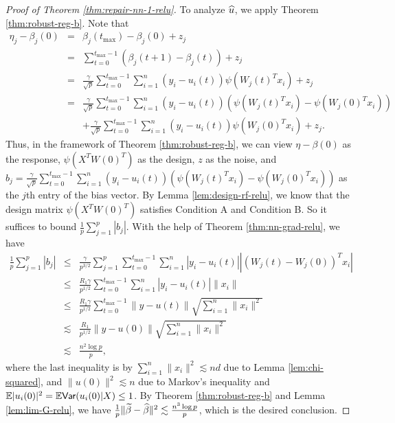 \begin{proof}[Proof of Theorem \ref{thm:repair-nn-1-relu}]
To analyze $\widehat{u}$, we apply Theorem \ref{thm:robust-reg-b}. Note that
\begin{eqnarray*}
\eta_j - \beta_j(0) &=& \beta_j(t_{\max}) - \beta_j(0) +z_j \\
&=& \sum_{t=0}^{t_{\max}-1}\left(\beta_j(t+1)-\beta_j(t)\right) + z_j \\
&=& \frac{\gamma}{\sqrt{p}}\sum_{t=0}^{t_{\max}-1}\sum_{i=1}^n(y_i-u_i(t))\psi(W_j(t)^Tx_i) + z_j \\
&=& \frac{\gamma}{\sqrt{p}}\sum_{t=0}^{t_{\max}-1}\sum_{i=1}^n(y_i-u_i(t))(\psi(W_j(t)^Tx_i)-\psi(W_j(0)^Tx_i)) \\
&& + \frac{\gamma}{\sqrt{p}}\sum_{t=0}^{t_{\max}-1}\sum_{i=1}^n(y_i-u_i(t))\psi(W_j(0)^Tx_i) + z_j.
\end{eqnarray*}
Thus, in the framework of Theorem \ref{thm:robust-reg-b}, we can view $\eta-\beta(0)$ as the response, $\psi(X^TW(0)^T)$ as the design, $z$ as the noise, and $b_j=\frac{\gamma}{\sqrt{p}}\sum_{t=0}^{t_{\max}-1}\sum_{i=1}^n(y_i-u_i(t))(\psi(W_j(t)^Tx_i)-\psi(W_j(0)^Tx_i))$ as the $j$th entry of the bias vector. By Lemma \ref{lem:design-rf-relu}, we know that the design matrix $\psi(X^TW(0)^T)$ satisfies Condition A and Condition B. So it suffices to bound $\frac{1}{p}\sum_{j=1}^p|b_j|$. With the help of Theorem \ref{thm:nn-grad-relu}, we have
\begin{eqnarray*}
\frac{1}{p}\sum_{j=1}^p|b_j| &\leq& \frac{\gamma}{p^{3/2}}\sum_{j=1}^p\sum_{t=0}^{t_{\max}-1}\sum_{i=1}^n|y_i-u_i(t)||(W_j(t)-W_j(0))^Tx_i| \\
&\leq& \frac{R_1\gamma}{p^{1/2}}\sum_{t=0}^{t_{\max}-1}\sum_{i=1}^n|y_i-u_i(t)|\|x_i\| \\
&\leq& \frac{R_1\gamma}{p^{1/2}}\sum_{t=0}^{t_{\max}-1}\|y-u(t)\|\sqrt{\sum_{i=1}^n\|x_i\|^2} \\
&\lesssim& \frac{R_1}{p^{1/2}}\|y-u(0)\|\sqrt{\sum_{i=1}^n\|x_i\|^2} \\
&\lesssim& \frac{n^2\log p}{p},
\end{eqnarray*}
where the last inequality is by $\sum_{i=1}^n\|x_i\|^2\lesssim nd$ due to Lemma \ref{lem:chi-squared}, and $\|u(0)\|^2\lesssim n$ due to Markov's inequality and $\mathbb{E}|u_i(0)|^2 = \mathbb{E}\textsf{Var}(u_i(0)|X) \leq 1$. By Theorem \ref{thm:robust-reg-b} and Lemma \ref{lem:lim-G-relu}, we have $\frac{1}{p}\|\widetilde{\beta}-\widehat{\beta}\|^2 \lesssim \frac{n^3\log p}{p}$, which is the desired conclusion.
\end{proof}


